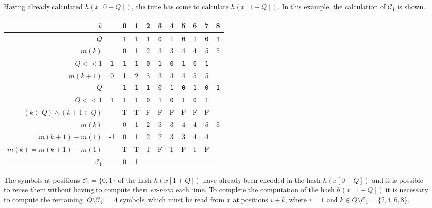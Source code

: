 \begin{example}
	Having already calculated $h(x[0 + Q])$, the time has come to calculate $h(x[1 + Q])$. In this example, the calculation of $\mathcal{C}_1$ is shown.
	
	\begin{center}
		\label{example:C_1}
		\begin{tabular}{r || c|cccccccc|c}
			$k$ & & 0 & 1 & 2 & 3 & 4 & 5 & 6 & 7 & 8 \\
			\midrule
			$Q$ & & \texttt{1} & \texttt{1} & \texttt{1} & \texttt{0} & \texttt{1} & \texttt{0} & \texttt{1} & \texttt{0} & \texttt{1} \\
			$m(k)$ & & 0 & 1 & 2 & 3 & 3 & 4 & 4 & 5 & 5 \\
			\midrule
			$Q <\!< 1$ & \texttt{1} & \texttt{1} & \texttt{1} & \texttt{0} & \texttt{1} & \texttt{0} & \texttt{1} & \texttt{0} & \texttt{1} & \\
			$m(k + 1)$ & 0 & 1 & 2 & 3 & 3 & 4 & 4 & 5 & 5 & \\
			\midrule
			$Q$ & & \texttt{1} & \texttt{1} & \texttt{1} & \texttt{0} & \texttt{1} & \texttt{0} & \texttt{1} & \texttt{0} & \texttt{1} \\
			$Q <\!< 1$ & \texttt{1} & \texttt{1} & \texttt{1} & \texttt{0} & \texttt{1} & \texttt{0} & \texttt{1} & \texttt{0} & \texttt{1} & \\
			$(k \in Q) \wedge (k + 1 \in Q)$ & & T & T & F & F & F & F & F & F & \\
			\midrule
			$m(k)$ & & 0 & 1 & 2 & 3 & 3 & 4 & 4 & 5 & 5 \\
			$m(k + 1) - m(1)$ & -1 & 0 & 1 & 2 & 2 & 3 & 3 & 4 & 4 & \\
			$m(k) = m(k + 1) - m(1)$ & & T & T & T & F & T & F & T & F & \\
			\midrule
			$\mathcal{C}_1$ & & 0 & 1 & & & & & & & \\
		\end{tabular}
	\end{center}
	
	The symbols at positions $\mathcal{C}_1 = \{ 0, 1 \}$ of the hash $h(x[1 + Q])$ have already been encoded in the hash $h(x[0 + Q])$ and it is possible to reuse them without having to compute them \emph{ex-novo} each time. To complete the computation of the hash $h(x[1 + Q])$ it is necessary to compute the remaining $|Q \setminus \mathcal{C}_1| = 4$ symbols, which must be read from $x$ at positions $i + k$, where $i = 1$ and $k \in Q \setminus \mathcal{C}_1 = \{ 2, 4, 6, 8 \}$.
	

\end{example}
